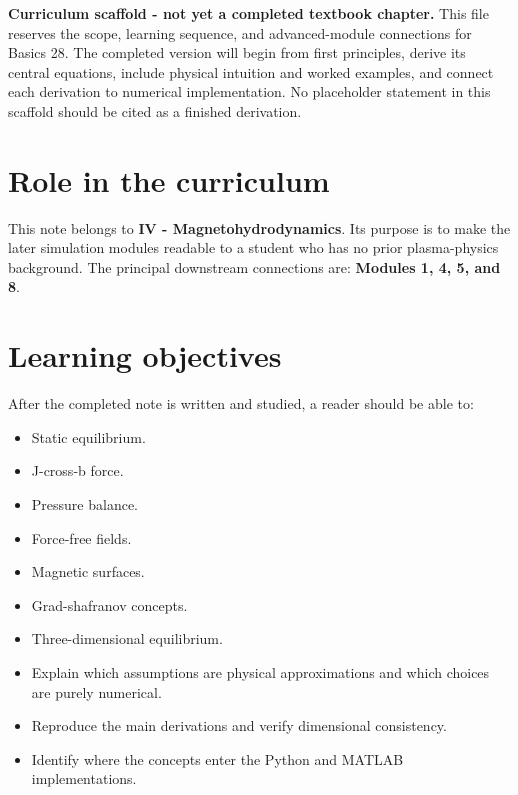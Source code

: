 \documentclass[11pt]{article}
\begin{document}

\begin{overviewbox}
\textbf{Curriculum scaffold - not yet a completed textbook chapter.} This file reserves the scope, learning sequence, and advanced-module connections for Basics 28. The completed version will begin from first principles, derive its central equations, include physical intuition and worked examples, and connect each derivation to numerical implementation. No placeholder statement in this scaffold should be cited as a finished derivation.
\end{overviewbox}

\ProjectTOC

\section{Role in the curriculum}
This note belongs to \textbf{IV - Magnetohydrodynamics}. Its purpose is to make the later simulation modules readable to a student who has no prior plasma-physics background. The principal downstream connections are: \textbf{Modules 1, 4, 5, and 8}.

\section{Learning objectives}
After the completed note is written and studied, a reader should be able to:
\begin{itemize}[leftmargin=1.6em]
\item Static equilibrium.
\item J-cross-b force.
\item Pressure balance.
\item Force-free fields.
\item Magnetic surfaces.
\item Grad-shafranov concepts.
\item Three-dimensional equilibrium.
\item Explain which assumptions are physical approximations and which choices are purely numerical.
\item Reproduce the main derivations and verify dimensional consistency.
\item Identify where the concepts enter the Python and MATLAB implementations.
\end{itemize}
\end{document}
